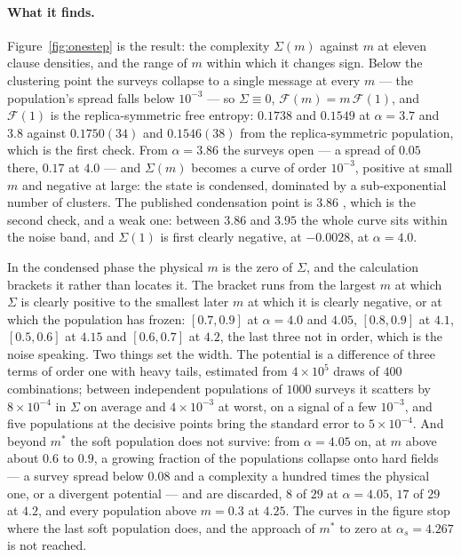 \paragraph{What it finds.} Figure~\ref{fig:onestep} is the result: the
complexity $\Sigma(m)$ against $m$ at eleven clause densities, and the
range of $m$ within which it changes sign. Below the clustering point the
surveys collapse to a single message at every $m$ --- the population's
spread falls below $10^{-3}$ --- so $\Sigma\equiv0$,
$\mathcal{F}(m)=m\,\mathcal{F}(1)$, and $\mathcal{F}(1)$ is the
replica-symmetric free entropy: $0.1738$ and $0.1549$ at $\alpha=3.7$ and
$3.8$ against $0.1750(34)$ and $0.1546(38)$ from the replica-symmetric
population, which is the first check. From $\alpha=3.86$ the surveys open
--- a spread of $0.05$ there, $0.17$ at $4.0$ --- and $\Sigma(m)$ becomes a
curve of order $10^{-3}$, positive at small $m$ and negative at large: the
state is condensed, dominated by a sub-exponential number of clusters. The
published condensation point is $3.86$ \citep{krzakala2007,montanari2008},
which is the second check, and a weak one: between $3.86$ and $3.95$ the
whole curve sits within the noise band, and $\Sigma(1)$ is first clearly
negative, at $-0.0028$, at $\alpha=4.0$.

In the condensed phase the physical $m$ is the zero of $\Sigma$, and the
calculation brackets it rather than locates it. The bracket runs from the
largest $m$ at which $\Sigma$ is clearly positive to the smallest later
$m$ at which it is clearly negative, or at which the population has frozen:
$[0.7,0.9]$ at $\alpha=4.0$ and $4.05$, $[0.8,0.9]$ at $4.1$, $[0.5,0.6]$
at $4.15$ and $[0.6,0.7]$ at $4.2$, the last three not in order, which is
the noise speaking. Two things set the width. The potential is a
difference of three terms of order one with heavy tails, estimated from
$4\times10^{5}$ draws of $400$ combinations; between independent populations
of $1000$ surveys it scatters by $8\times10^{-4}$ in $\Sigma$ on average
and $4\times10^{-3}$ at worst, on a signal of a few $10^{-3}$, and five
populations at the decisive points bring the standard error to
$5\times10^{-4}$. And beyond $m^{*}$ the soft population does not survive:
from $\alpha=4.05$ on, at $m$ above about $0.6$ to $0.9$, a growing
fraction of the populations collapse onto hard fields --- a survey spread
below $0.08$ and a complexity a hundred times the physical one, or a
divergent potential --- and are discarded, $8$ of $29$ at $\alpha=4.05$,
$17$ of $29$ at $4.2$, and every population above $m=0.3$ at $4.25$. The
curves in the figure stop where the last soft population does, and the
approach of $m^{*}$ to zero at $\alpha_{s}=4.267$ is not reached.

